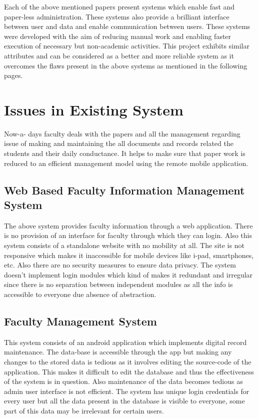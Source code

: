 \documentclass[BTech]{srmuthesis}
\begin{document}
Each of the above mentioned papers present systems which enable fast and paper-less
administration. These systems also provide a brilliant interface between user and data and
enable communication between users. These systems were developed with the aim of reducing manual work and enabling faster execution of necessary but non-academic activities. This project exhibits similar attributes and can be considered as a better and more reliable system as it overcomes the flaws present in the above systems as mentioned in the following pages.
\section{Issues in Existing System}
Now-a- days faculty deals with the papers and all the management regarding issue of making and
maintaining the all documents and records related the students and their daily conductance. It helps to
make sure that paper work is reduced to an efficient management model using the remote mobile
application.

\subsection{Web Based Faculty Information Management System}
The above system provides faculty information through a web application. There is no provision
of an interface for faculty through which they can login. Also this system consists of a
standalone website with no mobility at all. The site is not responsive which makes it
inaccessible for mobile devices like i-pad, smartphones, etc. Also there are no security
measures to ensure data privacy. The system doesn't implement login modules which kind of
makes it redundant and irregular since there is no separation between independent modules as
all the info is accessible to everyone due absence of abstraction.
\subsection{Faculty Management System}
This system consists of an android application which implements digital record maintenance.
The data-base is accessible through the app but making any changes to the stored data is
tedious as it involves editing the source-code of the application. This makes it difficult to edit
the database and thus the effectiveness of the system is in question. Also maintenance of the
data becomes tedious as admin user interface is not efficient. The system has unique login
credentials for every user but all the data present in the database is visible to everyone, some
part of this data may be irrelevant for certain users.
\end{document}
